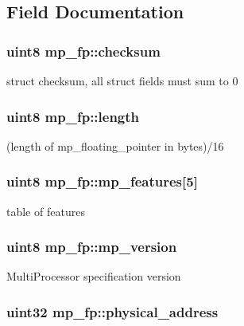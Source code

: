 \subsection{Field Documentation}
\hypertarget{structmp__fp_aa1aaa861e57ff7021fd7f2a446e986ec}{
\subsubsection[{checksum}]{\setlength{\rightskip}{0pt plus 5cm}uint8 {\bf mp\_\-fp::checksum}}}
\label{structmp__fp_aa1aaa861e57ff7021fd7f2a446e986ec}
struct checksum, all struct fields must sum to 0 \hypertarget{structmp__fp_a027a047614a3f10f65b691e4d118f751}{
\subsubsection[{length}]{\setlength{\rightskip}{0pt plus 5cm}uint8 {\bf mp\_\-fp::length}}}
\label{structmp__fp_a027a047614a3f10f65b691e4d118f751}
(length of mp\_\-floating\_\-pointer in bytes)/16 \hypertarget{structmp__fp_aff7cb275110c037679f1ce06971fc3e9}{
\subsubsection[{mp\_\-features}]{\setlength{\rightskip}{0pt plus 5cm}uint8 {\bf mp\_\-fp::mp\_\-features}\mbox{[}5\mbox{]}}}
\label{structmp__fp_aff7cb275110c037679f1ce06971fc3e9}
table of features \hypertarget{structmp__fp_a237961558ddc5aa91d18d84cd9a109fa}{
\subsubsection[{mp\_\-version}]{\setlength{\rightskip}{0pt plus 5cm}uint8 {\bf mp\_\-fp::mp\_\-version}}}
\label{structmp__fp_a237961558ddc5aa91d18d84cd9a109fa}
MultiProcessor specification version \hypertarget{structmp__fp_ab714f4a6339f0a7bb19fec19c4e06877}{
\subsubsection[{physical\_\-address}]{\setlength{\rightskip}{0pt plus 5cm}uint32 {\bf mp\_\-fp::physical\_\-address}}}
